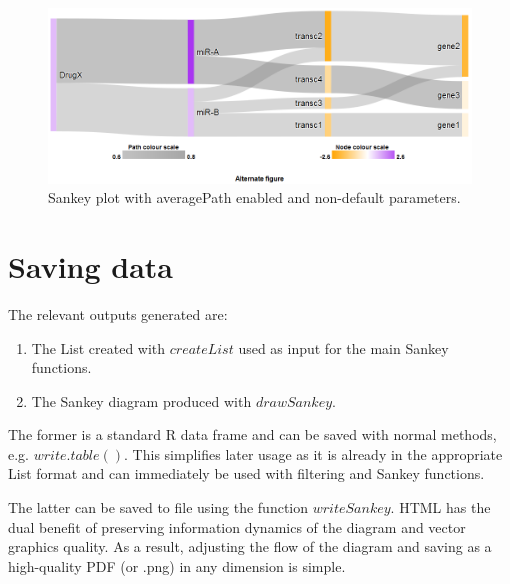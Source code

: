 \documentclass[a4paper]{article}
\begin{document}
\begin{figure}[htbp]
    \begin{center}
    \includegraphics[width=\textwidth]{figure3.png}
    \caption{Sankey plot with averagePath enabled and non-default parameters.}
    \label{fig:Custom}
    \end{center}
\end{figure}

\section{Saving data}
The relevant outputs generated are:
\begin{enumerate}
    \item The List created with $createList$ used as input for the main Sankey functions.
    \item The Sankey diagram produced with $drawSankey$.
\end{enumerate}
The former is a standard R data frame and can be saved with normal methods, e.g. $write.table()$. This simplifies later usage as it is already in the appropriate List format and can immediately be used with filtering and Sankey functions.

The latter can be saved to file using the function $writeSankey$. HTML has the dual benefit of preserving information dynamics of the diagram and vector graphics quality. As a result, adjusting the flow of the diagram and saving as a high-quality PDF (or .png) in any dimension is simple.
\end{document}

